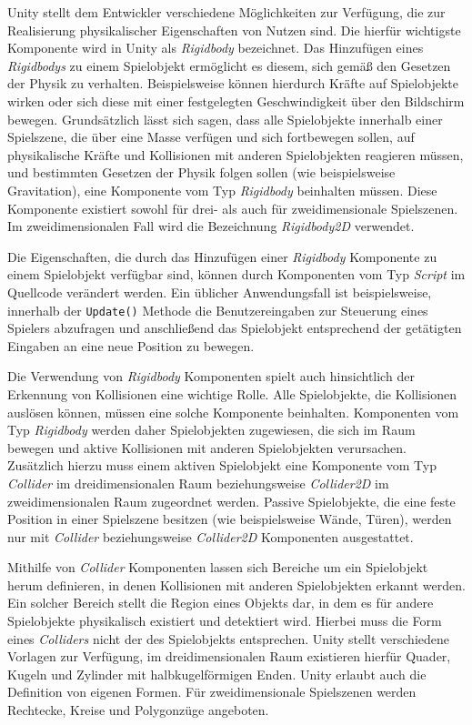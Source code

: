 Unity stellt dem Entwickler verschiedene Möglichkeiten zur Verfügung, die zur Realisierung physikalischer Eigenschaften von Nutzen sind. Die hierfür wichtigste Komponente wird in Unity als \textit{Rigidbody} bezeichnet. Das Hinzufügen eines \textit{Rigidbodys} zu einem Spielobjekt ermöglicht es diesem, sich gemäß den Gesetzen der Physik zu verhalten. Beispielsweise können hierdurch Kräfte auf Spielobjekte wirken oder sich diese mit einer festgelegten Geschwindigkeit über den Bildschirm bewegen. Grundsätzlich lässt sich sagen, dass alle Spielobjekte innerhalb einer Spielszene, die über eine Masse verfügen und sich fortbewegen sollen, auf physikalische Kräfte und Kollisionen mit anderen Spielobjekten reagieren müssen, und bestimmten Gesetzen der Physik folgen sollen (wie beispielsweise Gravitation), eine Komponente vom Typ \textit{Rigidbody} beinhalten müssen. Diese Komponente existiert sowohl für drei- als auch für zweidimensionale Spielszenen. Im zweidimensionalen Fall wird die Bezeichnung \textit{Rigidbody2D} verwendet. 

Die Eigenschaften, die durch das Hinzufügen einer \textit{Rigidbody} Komponente zu einem Spielobjekt verfügbar sind, können durch Komponenten vom Typ \textit{Script} im Quellcode verändert werden. Ein üblicher Anwendungsfall ist beispielsweise, innerhalb der \texttt{Update()} Methode die Benutzereingaben zur Steuerung eines Spielers abzufragen und anschließend das Spielobjekt entsprechend der getätigten Eingaben an eine neue Position zu bewegen.   

Die Verwendung von \textit{Rigidbody} Komponenten spielt auch hinsichtlich der Erkennung von Kollisionen eine wichtige Rolle. Alle Spielobjekte, die Kollisionen auslösen können, müssen eine solche Komponente beinhalten. Komponenten vom Typ \textit{Rigidbody} werden daher Spielobjekten zugewiesen, die sich im Raum bewegen und aktive Kollisionen mit anderen Spielobjekten verursachen. Zusätzlich hierzu muss einem aktiven Spielobjekt eine Komponente vom Typ \textit{Collider} im dreidimensionalen Raum beziehungsweise \textit{Collider2D} im zweidimensionalen Raum zugeordnet werden. Passive Spielobjekte, die eine feste Position in einer Spielszene besitzen (wie beispielsweise Wände, Türen), werden nur mit \textit{Collider} beziehungsweise \textit{Collider2D} Komponenten ausgestattet. 

Mithilfe von \textit{Collider} Komponenten lassen sich Bereiche um ein Spielobjekt herum definieren, in denen Kollisionen mit anderen Spielobjekten erkannt werden. Ein solcher Bereich stellt die Region eines Objekts dar, in dem es für andere Spielobjekte physikalisch existiert und detektiert wird. Hierbei muss die Form eines \textit{Colliders} nicht der des Spielobjekts entsprechen. Unity stellt verschiedene Vorlagen zur Verfügung, im dreidimensionalen Raum existieren hierfür Quader, Kugeln und Zylinder mit halbkugelförmigen Enden. Unity erlaubt auch die Definition von eigenen Formen. Für zweidimensionale Spielszenen werden Rechtecke, Kreise und Polygonzüge angeboten. 

